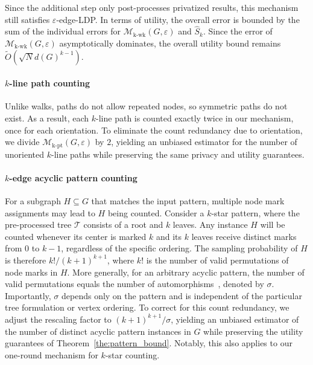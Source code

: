 Since the additional step only post-processes privatized results, this mechanism still satisfies $\varepsilon$-edge-LDP.
In terms of utility, the overall error is bounded by the sum of the individual errors for $\mathcal{M}_{\mathrm{k\text{-}wk}}(G, \varepsilon)$ and $\hat{S}_k$. 
Since the error of $\mathcal{M}_{\mathrm{k\text{-}wk}}(G, \varepsilon)$ asymptotically dominates, the overall utility bound remains $\tilde{O}(\sqrt{N}d(G)^{k-1})$.




\paragraph{$k$-line path counting}  
Unlike walks, paths do not allow repeated nodes, so symmetric paths do not exist.  
As a result, each $k$-line path is counted exactly twice in our mechanism, once for each orientation. 
To eliminate the count redundancy due to orientation, we divide $\mathcal{M}_{\mathrm{k\text{-}pt}}(G, \varepsilon)$ by $2$, 
yielding an unbiased estimator for the number of unoriented $k$-line paths while preserving the same privacy and utility guarantees.




\paragraph{$k$-edge acyclic pattern counting}

For a subgraph $H \subseteq G$ that matches the input pattern, multiple node mark assignments may lead to $H$ being counted. 
Consider a $k$-star pattern, where the pre-processed tree $\mathcal{T}$ consists of a root and $k$ leaves.
Any instance $H$ will be counted whenever its center is marked $k$ and its $k$ leaves receive distinct marks from $0$ to $k-1$, regardless of the specific ordering.
The sampling probability of $H$ is therefore $k!/(k+1)^{k+1}$, where $k!$ is the number of valid permutations of node marks in $H$. 
More generally, for an arbitrary acyclic pattern, the number of valid permutations equals the number of automorphisms~\cite{godsil2013algebraic}, denoted by $\sigma$.
Importantly, $\sigma$ depends only on the pattern and is independent of the particular tree formulation or vertex ordering.
To correct for this count redundancy, we adjust the rescaling factor to $(k+1)^{k+1}/\sigma$, yielding an unbiased estimator of the number of distinct acyclic pattern instances in $G$ while preserving the utility guarantees of Theorem~\ref{the:pattern_bound}.
Notably, this also applies to our one-round mechanism for $k$-star counting. 


